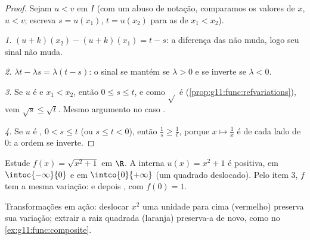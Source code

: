 \begin{proof}
Sejam $u < v$ em $I$ (com um abuso de notação, comparamos os valores de
$x$, $u < v$; escreva $s = u(x_1)$, $t = u(x_2)$ para as  de
$x_1 < x_2$).

\emph{1.} $(u+k)(x_2) - (u+k)(x_1) = t - s$: a diferença das  não
muda, logo seu sinal não muda.

\emph{2.} $\lambda t - \lambda s = \lambda(t - s)$: o sinal se mantém se
$\lambda > 0$ e se inverte se $\lambda < 0$.

\emph{3.} Se $u$ é  e $x_1 < x_2$, então $0 \leq s \leq t$, e
como $\sqrt{}$ é  (\cref{prop:g11:func:refvariations}), vem
$\sqrt s \leq \sqrt t$. Mesmo argumento no caso .

\emph{4.} Se $u$ é , $0 < s \leq t$ (ou $s \leq t < 0$), então
$\frac1s \geq \frac1t$, porque $x \mapsto \frac1x$ é  de cada
lado de $0$: a ordem se inverte.
\end{proof}

\begin{example}\label{ex:g11:func:composite}
Estude $f(x) = \sqrt{x^2 + 1}$ em $\R$. A  interna
$u(x) = x^2 + 1$ é positiva,  em $\intoc{-\infty}{0}$ e
 em $\intco{0}{+\infty}$ (um quadrado deslocado). Pelo item 3,
$f$ tem a mesma variação:  e depois , com 
$f(0) = 1$.
\end{example}

\begin{omfigure}

{\small Transformações em ação: deslocar $x^2$ uma unidade para cima
(vermelho) preserva sua variação; extrair a raiz quadrada (laranja)
preserva-a de novo, como no \cref{ex:g11:func:composite}.}
\end{omfigure}

